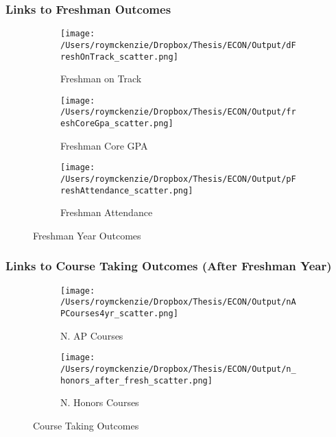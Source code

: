 \documentclass{beamer}
\begin{document}
\begin{frame}
\frametitle{Links to Freshman Outcomes}

\begin{figure}
     \centering
     \begin{subfigure}[b]{0.3\textwidth}
         \centering
         \texttt{[image: /Users/roymckenzie/Dropbox/Thesis/ECON/Output/dFreshOnTrack\_scatter.png]}
         \caption{Freshman on Track}
         \label{fig:dFreshOnTrack}
     \end{subfigure}
     \hfill
     \begin{subfigure}[b]{0.3\textwidth}
         \centering
         \texttt{[image: /Users/roymckenzie/Dropbox/Thesis/ECON/Output/freshCoreGpa\_scatter.png]}
         \caption{Freshman Core GPA}
         \label{fig:freshCoreGpa}
     \end{subfigure}
     \hfill
     \begin{subfigure}[b]{0.3\textwidth}
         \centering
         \texttt{[image: /Users/roymckenzie/Dropbox/Thesis/ECON/Output/pFreshAttendance\_scatter.png]}
         \caption{Freshman Attendance}
         \label{fig:pFreshAttendance}
     \end{subfigure}
        \caption{Freshman Year Outcomes}
        \label{fig:fresh}
\end{figure}


\end{frame}


\begin{frame}
\frametitle{Links to Course Taking Outcomes (After Freshman Year)}

\begin{figure}
     \centering
     \begin{subfigure}[b]{0.48\textwidth}
         \centering
         \texttt{[image: /Users/roymckenzie/Dropbox/Thesis/ECON/Output/nAPCourses4yr\_scatter.png]}
         \caption{N. AP Courses}
         \label{fig:nAPCourses4yr}
     \end{subfigure}
     \begin{subfigure}[b]{0.48\textwidth}
         \centering
         \texttt{[image: /Users/roymckenzie/Dropbox/Thesis/ECON/Output/n\_honors\_after\_fresh\_scatter.png]}
         \caption{N. Honors Courses}
         \label{fig:freshCoreGpa}
     \end{subfigure}
      \caption{Course Taking Outcomes}
      \label{fig:course}
\end{figure}
\end{frame}
\end{document}
